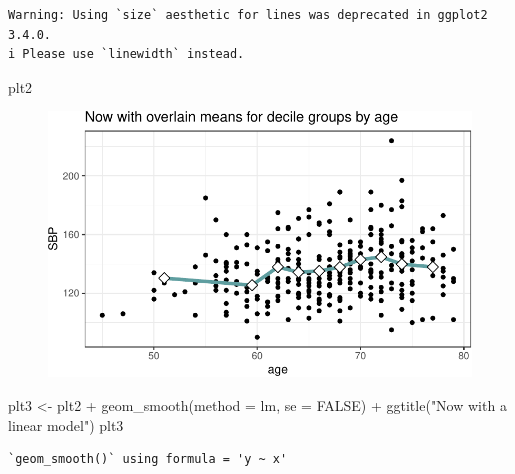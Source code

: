 \documentclass[
  letterpaper,
  DIV=11,
  numbers=noendperiod]{scrreport}
\newenvironment{Shaded}{\begin{snugshade}}{\end{snugshade}}
\newcommand{\AttributeTok}[1]{\textcolor[rgb]{0.40,0.45,0.13}{#1}}
\newcommand{\ConstantTok}[1]{\textcolor[rgb]{0.56,0.35,0.01}{#1}}
\newcommand{\FunctionTok}[1]{\textcolor[rgb]{0.28,0.35,0.67}{#1}}
\newcommand{\NormalTok}[1]{\textcolor[rgb]{0.00,0.23,0.31}{#1}}
\newcommand{\OtherTok}[1]{\textcolor[rgb]{0.00,0.23,0.31}{#1}}
\newcommand{\SpecialCharTok}[1]{\textcolor[rgb]{0.37,0.37,0.37}{#1}}
\newcommand{\StringTok}[1]{\textcolor[rgb]{0.13,0.47,0.30}{#1}}
\begin{document}
\begin{verbatim}
Warning: Using `size` aesthetic for lines was deprecated in ggplot2 3.4.0.
i Please use `linewidth` instead.
\end{verbatim}

\begin{Shaded}
\begin{Highlighting}[]
\NormalTok{plt2 }
\end{Highlighting}
\end{Shaded}

\begin{figure}[H]

{\centering \includegraphics{week1/week1_files/figure-pdf/unnamed-chunk-4-2.pdf}

}

\end{figure}

\begin{Shaded}
\begin{Highlighting}[]
\NormalTok{plt3 }\OtherTok{\textless{}{-}} 
\NormalTok{  plt2 }\SpecialCharTok{+} 
  \FunctionTok{geom\_smooth}\NormalTok{(}\AttributeTok{method =} \StringTok{\textquotesingle{}lm\textquotesingle{}}\NormalTok{, }\AttributeTok{se =} \ConstantTok{FALSE}\NormalTok{) }\SpecialCharTok{+} 
  \FunctionTok{ggtitle}\NormalTok{(}\StringTok{"Now with a linear model"}\NormalTok{) }
\NormalTok{plt3 }
\end{Highlighting}
\end{Shaded}

\begin{verbatim}
`geom_smooth()` using formula = 'y ~ x'
\end{verbatim}
\end{document}
